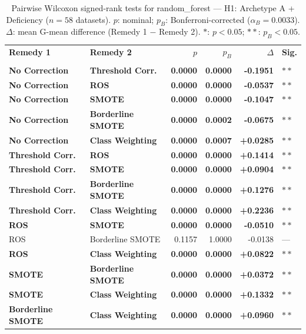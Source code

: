 \begin{table}[ht]
\centering
\scriptsize
\caption{Pairwise Wilcoxon signed-rank tests for random_forest --- H1: Archetype A + Deficiency ($n=58$ datasets). $p$: nominal; $p_B$: Bonferroni-corrected ($\alpha_B=0.0033$). $\Delta$: mean G-mean difference (Remedy 1 $-$ Remedy 2). $\ast$: $p<0.05$; $\ast\ast$: $p_B<0.05$.}
\label{tab:wilcoxon_random_forest_h1}
\begin{tabular}{llrrrl}
\toprule
\textbf{Remedy 1} & \textbf{Remedy 2} & \textbf{$p$} & \textbf{$p_B$} & \textbf{$\Delta$} &  \textbf{Sig.} \\\\
\midrule
    \textbf{No Correction} & \textbf{Threshold Corr.} & \textbf{0.0000} & \textbf{0.0000} & \textbf{-0.1951} & $\ast\ast$ \\
    \textbf{No Correction} & \textbf{ROS} & \textbf{0.0000} & \textbf{0.0000} & \textbf{-0.0537} & $\ast\ast$ \\
    \textbf{No Correction} & \textbf{SMOTE} & \textbf{0.0000} & \textbf{0.0000} & \textbf{-0.1047} & $\ast\ast$ \\
    \textbf{No Correction} & \textbf{Borderline SMOTE} & \textbf{0.0000} & \textbf{0.0002} & \textbf{-0.0675} & $\ast\ast$ \\
    \textbf{No Correction} & \textbf{Class Weighting} & \textbf{0.0000} & \textbf{0.0007} & \textbf{+0.0285} & $\ast\ast$ \\
    \textbf{Threshold Corr.} & \textbf{ROS} & \textbf{0.0000} & \textbf{0.0000} & \textbf{+0.1414} & $\ast\ast$ \\
    \textbf{Threshold Corr.} & \textbf{SMOTE} & \textbf{0.0000} & \textbf{0.0000} & \textbf{+0.0904} & $\ast\ast$ \\
    \textbf{Threshold Corr.} & \textbf{Borderline SMOTE} & \textbf{0.0000} & \textbf{0.0000} & \textbf{+0.1276} & $\ast\ast$ \\
    \textbf{Threshold Corr.} & \textbf{Class Weighting} & \textbf{0.0000} & \textbf{0.0000} & \textbf{+0.2236} & $\ast\ast$ \\
    \textbf{ROS} & \textbf{SMOTE} & \textbf{0.0000} & \textbf{0.0000} & \textbf{-0.0510} & $\ast\ast$ \\
    ROS & Borderline SMOTE & 0.1157 & 1.0000 & -0.0138 & --- \\
    \textbf{ROS} & \textbf{Class Weighting} & \textbf{0.0000} & \textbf{0.0000} & \textbf{+0.0822} & $\ast\ast$ \\
    \textbf{SMOTE} & \textbf{Borderline SMOTE} & \textbf{0.0000} & \textbf{0.0000} & \textbf{+0.0372} & $\ast\ast$ \\
    \textbf{SMOTE} & \textbf{Class Weighting} & \textbf{0.0000} & \textbf{0.0000} & \textbf{+0.1332} & $\ast\ast$ \\
    \textbf{Borderline SMOTE} & \textbf{Class Weighting} & \textbf{0.0000} & \textbf{0.0000} & \textbf{+0.0960} & $\ast\ast$ \\
\bottomrule
\end{tabular}
\end{table}